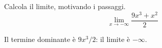 
\begin{esercizio}
Calcola il limite, motivando i passaggi.
\[
        \lim_{x\to -\infty}\frac{9x^3+x^2}{2}
    \]
\end{esercizio}

\begin{soluzione}
Il termine dominante è $9x^3/2$: il limite è $-\infty$.
\end{soluzione}

